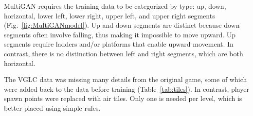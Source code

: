 MultiGAN requires the training data to be categorized by type:
up, down, horizontal, lower left, lower right, upper left, and upper right segments (Fig.~\ref{fig:MultiGANmodel}). Up and down segments are distinct because down segments often involve falling, thus making it impossible to move upward. Up segments require ladders and/or platforms that enable upward movement. In contrast, there is no distinction between left and right segments, which are both horizontal.


The VGLC data was missing many details from the original game, some of which were added back to the data before training (Table~\ref{tab:tiles}). 
In contrast, player spawn points were replaced with air tiles. Only one is needed per level, which is better placed using simple rules.







